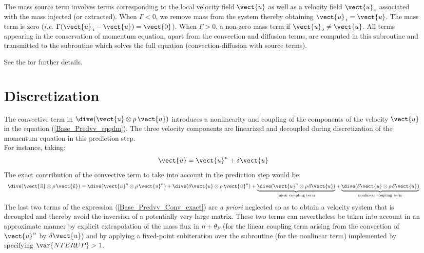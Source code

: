The mass source term involves terms corresponding to the local velocity field
$\vect {u}$ as well as a velocity field $\vect {u}_{\,i}$
associated with the mass injected (or extracted). When $\Gamma<0$, we remove mass from the system thereby
obtaining $\vect{u}_{\,i} = \vect{u}$. The mass term is zero (\emph{i.e.} $\Gamma
(\vect{u}_{\,i}-\vect{u})= \vect{0} $). When $\Gamma>0$, a non-zero
mass term if $\vect{u}_{\,i} \ne \vect{u}$.
All terms appearing in the conservation of momentum equation, apart from
the convection and diffusion terms, are computed in this subroutine and
transmitted to the
subroutine  which solves the full equation (convection-diffusion with source terms).

See the  for further details.

\section*{Discretization}

The convective term in $\dive(\vect{u} \otimes \rho\,\vect{u})$
introduces a nonlinearity and coupling of the components of the velocity
$\vect{u}$ in the equation (\ref{Base_Predvv_eqqdm}). The three velocity
components are linearized and decoupled during discretization of the momentum
equation in this prediction step.\\
For instance, taking:
\begin{equation}
\vect{\widetilde{u}}= \vect{u}^n + \delta \vect{u}
\end{equation}
The exact contribution of the convective term to take into account in the prediction step would be:
\begin{equation}\label{Base_Predvv_Conv_exact}
\begin{array}{ll}
\dive(\vect{\widetilde{u}} \otimes \rho\,\vect{\widetilde{u}}) =
\dive(\vect{u}^{n} \otimes \rho\,\vect{u}^{n}) + \dive(\delta \vect{u} \otimes
\rho\,\vect{u}^{n}) +  \underbrace { \dive(\vect{u}^{n} \otimes
\rho\,\delta \vect{u})}_{\text {linear coupling term}} +  \underbrace { \dive(\delta \vect{u} \otimes
\rho\,\delta \vect{u})}_{\text {nonlinear coupling term}}\\
\end{array}
\end{equation}
The last two terms of the expression (\ref{Base_Predvv_Conv_exact}) are {\em a priori} neglected
so as to obtain a velocity system that is decoupled and thereby avoid the
inversion of a potentially very large matrix. These two terms can
nevertheless be taken into account in an approximate manner by explicit
extrapolation of the mass flux in $n+\theta_F$ (for the linear coupling term
arising from the convection of $\vect{u}^{n}$ by $\delta \vect{u}$) and by
applying a fixed-point subiteration over the subroutine 
(for the nonlinear term) implemented by specifying  $\var{NTERUP}>1$.

